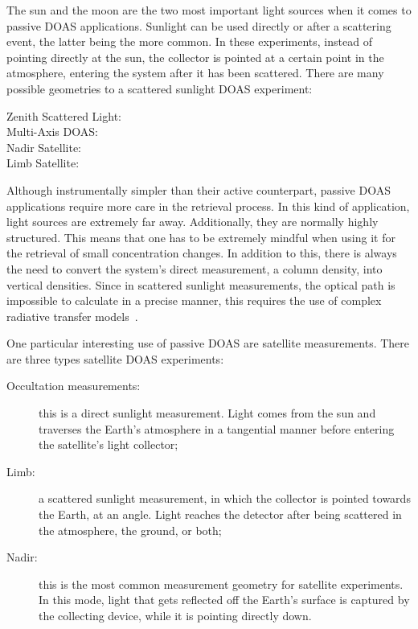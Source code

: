 The sun and the moon are the two most important light sources when it
comes to passive \gls{DOAS} applications. Sunlight can be used directly
or after a scattering event, the latter being the more common. In these
experiments, instead of pointing directly at the sun, the collector is
pointed at a certain point in the atmosphere, entering the system after
it has been scattered. There are many possible geometries to a scattered
sunlight \gls{DOAS} experiment:
\begin{description}
    \item[Zenith Scattered Light:] 
    \item[Multi-Axis \gls{DOAS}:]
    \item[Nadir Satellite:]
    \item[Limb Satellite:]
\end{description}

Although instrumentally simpler than their active counterpart, passive
\gls{DOAS} applications require more care in the retrieval process. In
this kind of application, light sources are extremely far away.
Additionally, they are normally highly structured. This means that one
has to be extremely mindful when using it for the retrieval of small
concentration changes. In addition to this, there is always the need to
convert the system's direct measurement, a column density, into vertical
densities. Since in scattered sunlight measurements, the optical path is
impossible to calculate in a precise manner, this requires the use of
complex radiative transfer models~\cite{Platt2007, Frins2006}.

One particular interesting use of passive \gls{DOAS} are satellite
measurements. There are three types satellite \gls{DOAS} experiments:
\begin{description}
    \item[Occultation measurements:] this is a direct sunlight
        measurement. Light comes from the sun and traverses the Earth's
        atmosphere in a tangential manner before entering the
        satellite's light collector;
    \item[Limb:] a scattered sunlight measurement, in which the
        collector is pointed towards the Earth, at an angle. Light
        reaches the detector after being scattered in the atmosphere,
        the ground, or both;
    \item[Nadir:] this is the most common measurement geometry for
        satellite experiments. In this mode, light that gets reflected
        off the Earth's surface is captured by the collecting device,
        while it is pointing directly down.
\end{description}


